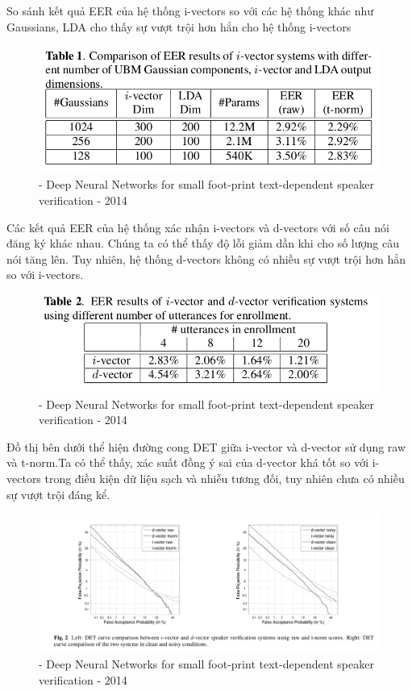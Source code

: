 \documentclass{article}
\begin{document}
	So sánh kết quả EER của hệ thống i-vectors so với các hệ thống khác như Gaussians, LDA cho thấy sự vượt trội hơn hẳn cho hệ thống i-vectors
	\begin{figure}[H]
		\centering
		\includegraphics[width=0.75\linewidth]{images/d-vectors-result-table-01.png}
		\caption{- Deep Neural Networks for small foot-print text-dependent speaker verification - 2014}
		\label{fig:writing-thesis}
	\end{figure}
	Các kết quả EER của hệ thống xác nhận i-vectors và d-vectors  với số câu nói đăng ký khác nhau. Chúng ta có thể thấy độ lỗi giảm dần khi cho số lượng câu nói tăng lên. Tuy nhiên, hệ thống d-vectors không có nhiều sự vượt trội hơn hẳn so với i-vectors.
	\begin{figure}[H]
		\centering
		\includegraphics[width=0.75\linewidth]{images/d-vectors-result-table-02.png}
		\caption{- Deep Neural Networks for small foot-print text-dependent speaker verification - 2014}
		\label{fig:writing-thesis}
	\end{figure}

	Đồ thị bên dưới thể hiện đường cong DET giữa i-vector và d-vector sử dụng raw và t-norm.Ta có thể thấy, xác suất đồng ý sai của d-vector khá tốt so với i-vectors trong điều kiện dữ liệu sạch và nhiễu tương đối, tuy nhiên chưa có nhiều sự vượt trội đáng kể.
	\begin{figure}[H]
		\centering
		\includegraphics[width=0.85\linewidth]{images/i-vectors-d-vectors-det-compare.png}
		\caption{- Deep Neural Networks for small foot-print text-dependent speaker verification - 2014}
		\label{fig:writing-thesis}
	\end{figure}
\end{document}
